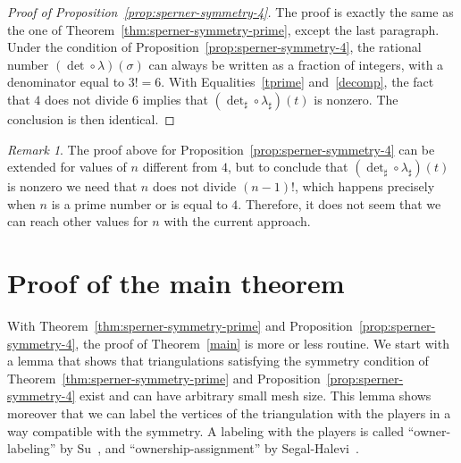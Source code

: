 \documentclass[12pt]{amsart}
\theoremstyle{definition}
\theoremstyle{remark}
\newtheorem*{remark}{Remark}
\def\det{\operatorname{det}}
\def\blue{\color{blue}}
\begin{document}
\begin{proof}[Proof of Proposition~\ref{prop:sperner-symmetry-4}]
The proof is exactly the same as the one of Theorem~\ref{thm:sperner-symmetry-prime}, except the last paragraph. Under the condition of Proposition~\ref{prop:sperner-symmetry-4}, the rational number $(\det\circ\lambda)(\sigma)$ can always be written as a fraction of integers, with a denominator equal to $3!=6$. With Equalities~\eqref{tprime} and~\eqref{decomp}, the fact that $4$ does not divide $6$ implies that $(\det_{\sharp}\circ\lambda_{\sharp})(t)$ is nonzero. The conclusion is then identical.
\end{proof}


\begin{remark}
The proof above for Proposition~\ref{prop:sperner-symmetry-4} can be extended for values of $n$ different from $4$, but to conclude that $(\det_{\sharp}\circ\lambda_{\sharp})(t)$ is nonzero we need that $n$ does not divide $(n-1)!$, which happens precisely when $n$ is a prime number or is equal to $4$. Therefore, it does not seem that we can reach other values for $n$ with the current approach.
\end{remark}

\section{Proof of the main theorem}


With Theorem~\ref{thm:sperner-symmetry-prime} and Proposition~\ref{prop:sperner-symmetry-4}, the proof of Theorem~\ref{main} is more or less routine. 
We start with a lemma that shows that triangulations satisfying the symmetry condition of Theorem~\ref{thm:sperner-symmetry-prime} and Proposition~\ref{prop:sperner-symmetry-4} exist 
and can have arbitrary small mesh size. This lemma shows moreover that we can label the vertices of the triangulation with the players in a way compatible with the symmetry. A labeling with the players  is called  ``owner-labeling'' by Su~\cite{su1999rental}, and ``ownership-assignment'' by Segal-Halevi~\cite{segal2017fairly}.
\end{document}
